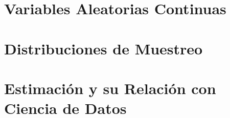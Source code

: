 \documentclass[
]{tufte-book}
\begin{document}
\chapter{Variables Aleatorias Continuas}













\chapter{Distribuciones de Muestreo}



















\chapter{Estimación y su Relación con Ciencia de Datos}















\end{document}
